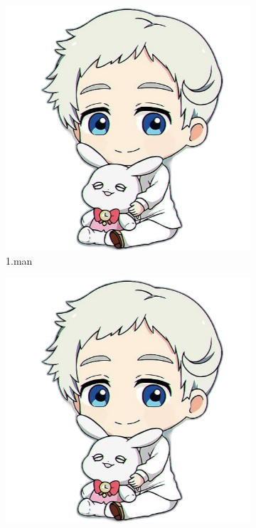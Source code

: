 \documentclass{article}
\begin{document}
\begin{figure}[h!]
  \centering
  
  \begin{subfigure}[b]{0.2\linewidth}
    \includegraphics[width=\linewidth]{man.jpg}
     \caption{1.man}
  \end{subfigure}
  \begin{subfigure}[b]{0.2\linewidth}
    \includegraphics[width=\linewidth]{man.jpg}

\end{subfigure}
\end{figure}
\end{document}
